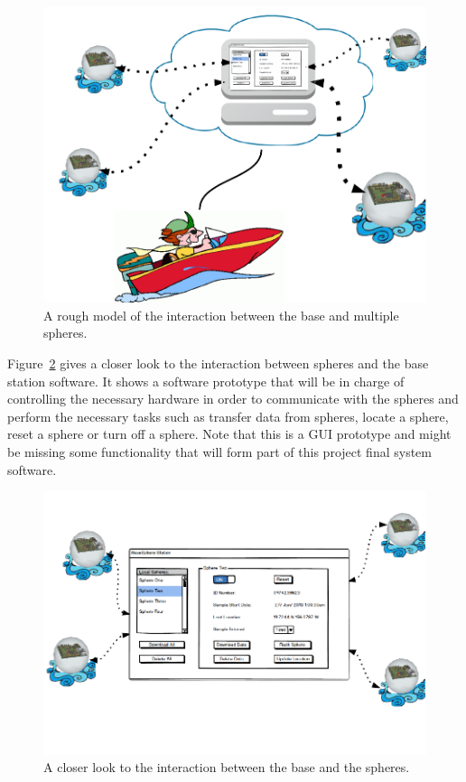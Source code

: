 \begin{figure}[H]
	\centering
	\includegraphics[scale=0.6]{img/GSV2}
	\caption{A rough model of the interaction between the base and multiple spheres. \label{fig:GSV2}}
\end{figure}

Figure~\ref{fig:GSV3} gives a closer look to the interaction between spheres and the base station software.  It shows a software prototype that will be in charge of controlling the necessary hardware in order to communicate with the spheres and perform the necessary tasks such as transfer data from spheres, locate a sphere, reset a sphere or turn off a sphere.  Note that this is a GUI prototype and might be missing some functionality that will form part of this project final system software.  

\begin{figure}[H]
	\centering
	\includegraphics[scale=0.6]{img/GSV3}
	\caption{A closer look to the interaction between the base and the spheres. \label{fig:GSV3}}
\end{figure}

